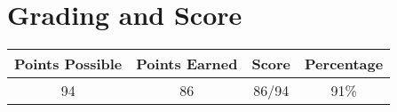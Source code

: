 \documentclass[11pt, letterpaper]{article}
\begin{document}
% 
% 
\\
\\

\hline

\\

\section*{Grading and Score}
\begin{center}
	\begin{tabular}{|c|c|c|c|}
		\hline
		\textbf{Points Possible} & \textbf{Points Earned} & \textbf{Score} & \textbf{Percentage} \\
		\hline
		94 & 86 & 86/94 & 91\% \\
		\hline		
	\end{tabular}
\end{center}
\end{document}
